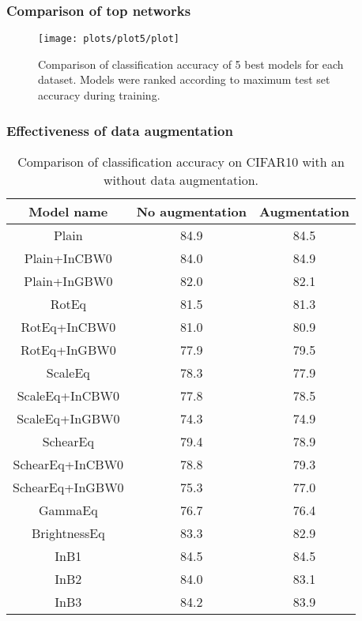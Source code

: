     \clearpage
    \subsubsection*{Comparison of top networks}
    \begin{figure}[h!]
        \centering
        \texttt{[image: plots/plot5/plot]}
        \caption{Comparison of classification accuracy of
            5 best models for each dataset.
            Models were ranked according to maximum test set accuracy during
            training.}
        \label{fig:plot5}
    \end{figure}

    \clearpage
    \subsubsection*{Effectiveness of data augmentation}
        \begin{table}
        \centering
        \begin{tabular}{|c|c|c|}
         \hline
         Model name & No augmentation & Augmentation \\
         \hline
            Plain & {84.9} & {84.5} \\
            Plain+InCBW0 & {84.0} & {84.9} \\
            Plain+InGBW0 & {82.0} & {82.1} \\
            RotEq & {81.5} & {81.3} \\
            RotEq+InCBW0 & {81.0} & {80.9} \\
            RotEq+InGBW0 & {77.9} & {79.5} \\
            ScaleEq & {78.3} & {77.9} \\
            ScaleEq+InCBW0 & {77.8} & {78.5} \\
            ScaleEq+InGBW0 & {74.3} & {74.9} \\
            SchearEq & {79.4} & {78.9} \\
            SchearEq+InCBW0 & {78.8} & {79.3} \\
            SchearEq+InGBW0 & {75.3} & {77.0} \\
            GammaEq & {76.7} & {76.4} \\
            BrightnessEq & {83.3} & {82.9} \\
            InB1 & {84.5} & {84.5} \\
            InB2 & {84.0} & {83.1} \\
            InB3 & {84.2} & {83.9} \\
         \hline
        \end{tabular}
        \caption{Comparison of classification accuracy on CIFAR10 with an without
            data augmentation.}
        \label{tab:jitter_table}
        \end{table}

